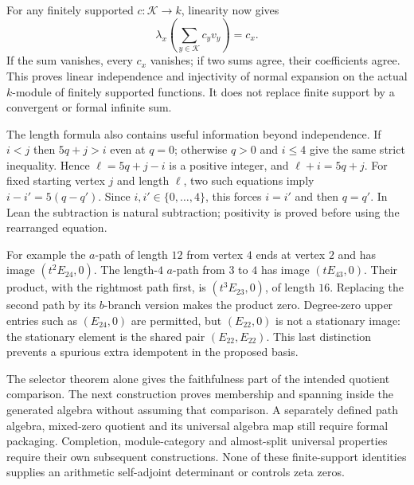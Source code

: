 \documentclass[11pt,oneside,openany]{book}
\theoremstyle{definition}\newtheorem{definition}[theorem]{Definition}
\theoremstyle{remark}\newtheorem{remark}[theorem]{Remark}
\begin{document}
For any finitely supported $c:\mathcal K\to k$, linearity now gives
\[
 \lambda_x\left(\sum_{y\in\mathcal K}c_yv_y\right)=c_x.
\]
If the sum vanishes, every $c_x$ vanishes; if two sums agree, their
coefficients agree. This proves linear independence and injectivity of
normal expansion on the actual $k$-module of finitely supported functions.
It does not replace finite support by a convergent or formal infinite sum.

The length formula also contains useful information beyond independence.
If $i<j$ then $5q+j>i$ even at $q=0$; otherwise $q>0$ and $i\leq4$ give
the same strict inequality. Hence $\ell=5q+j-i$ is a positive integer,
and $\ell+i=5q+j$. For fixed starting vertex $j$ and length $\ell$,
two such equations imply $i-i'=5(q-q')$. Since $i,i'\in\{0,\ldots,4\}$,
this forces $i=i'$ and then $q=q'$. In Lean the subtraction is natural
subtraction; positivity is proved before using the rearranged equation.

For example the $a$-path of length $12$ from vertex $4$ ends at vertex
$2$ and has image $(t^2E_{24},0)$. The length-$4$ $a$-path from $3$ to
$4$ has image $(tE_{43},0)$. Their product, with the rightmost path first,
is $(t^3E_{23},0)$, of length $16$. Replacing the second path by its
$b$-branch version makes the product zero. Degree-zero upper entries such
as $(E_{24},0)$ are permitted, but $(E_{22},0)$ is not a stationary image:
the stationary element is the shared pair $(E_{22},E_{22})$. This last
distinction prevents a spurious extra idempotent in the proposed basis.

The selector theorem alone gives the faithfulness part of the intended
quotient comparison. The next construction proves membership and spanning
inside the generated algebra without assuming that comparison. A separately
defined path algebra, mixed-zero quotient and its universal algebra map
still require formal packaging. Completion, module-category and almost-split
universal properties require their own subsequent constructions. None of
these finite-support identities supplies an arithmetic self-adjoint
determinant or controls zeta zeros.
\end{document}
